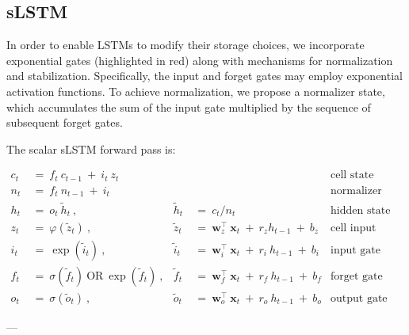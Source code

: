 \subsection{sLSTM}
\label{sec:sLSTM}

In order to enable LSTMs to modify their storage choices, we incorporate exponential gates (highlighted in red) along with mechanisms for normalization and stabilization. Specifically, the input and forget gates may employ exponential activation functions. To achieve normalization, we propose a normalizer state, which accumulates the sum of the input gate multiplied by the sequence of subsequent forget gates.

The scalar sLSTM forward pass is:

\begin{align}
\label{eq:slstmforward}
c_t \ &= \  f_t \ c_{t-1} \ + \ i_t \ z_t & & 
 &\text{cell state} \\
n_t \ &= \  f_t \ n_{t-1} \ + \ i_t  & & 
 &\text{normalizer state} \\
h_t \ &= \ o_t \ \tilde{h}_t \ ,
  &\tilde{h}_t \ &= \ c_t / n_t
&\text{hidden state} \\
z_t \ &= \ \varphi \left( \tilde{z}_t \right) \ , 
  &\tilde{z}_t \ &=  \ \mathbf{w}^\top_{z} \ \mathbf{x}_t \ + \
  r_{z}  h_{t-1} \ + \  b_{z}
  &\text{cell input} \\
i_t \ &= \ \!\exp \left( \tilde{i}_t  \right) \ , 
  &\tilde{i}_t \ &= \ \mathbf{w}^\top_{i} \ \mathbf{x}_t \ + \
  r_{i}  \ h_{t-1} \ + \  b_{i}
  &\text{input gate} \\
f_t \ &= \ \sigma \left(  \tilde{f}_t \right) \ \text{OR} \
\!\exp \left(  \tilde{f}_t \right) \ ,
  &\tilde{f}_t \ &= \ \mathbf{w}^\top_{f} \ \mathbf{x}_t  \ + \
  r_{f}  \ h_{t-1} \ + \  b_{f}
  &\text{forget gate} \\
o_t \ &= \ \sigma \left( \tilde{o}_t \right) \ , 
  &\tilde{o}_t  \ &= \ \mathbf{w}^\top_{o} \ \mathbf{x}_t \ + \
  r_{o}  \ h_{t-1} \ + \  b_{o}
  &\text{output gate} 
\end{align}

---

